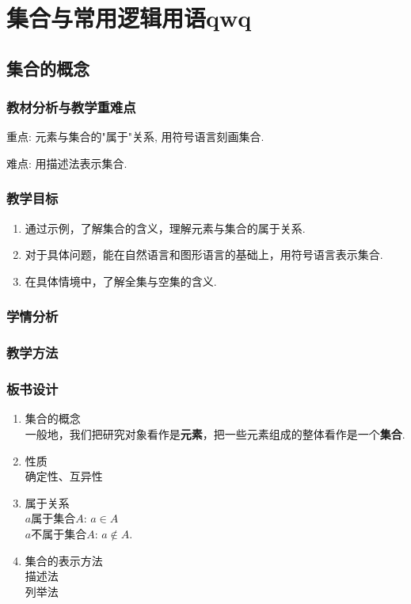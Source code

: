 \chapter{集合与常用逻辑用语qwq}
\section{集合的概念}
\subsection{教材分析与教学重难点}
重点: 元素与集合的"属于"关系, 用符号语言刻画集合.

难点: 用描述法表示集合.
\subsection{教学目标}
\begin{enumerate}
	\item 通过示例，了解集合的含义，理解元素与集合的属于关系.
	\item 对于具体问题，能在自然语言和图形语言的基础上，用符号语言表示集合.
	\item 在具体情境中，了解全集与空集的含义.
\end{enumerate}
\subsection{学情分析}

\subsection{教学方法}

\subsection{板书设计}
\begin{boardenv}[集合的概念]
	\begin{enumerate}
		\item 集合的概念\\
		      一般地，我们把研究对象看作是\textbf{元素}，把一些元素组成的整体看作是一个\textbf{集合}.
		\item 性质\\
			  确定性、互异性
		\item 属于关系\\
		      $a$属于集合$A$: $a\in A$\\
		      $a$不属于集合$A$: $a\notin A$.
		\item 集合的表示方法\\
		      描述法\\
		      列举法
	\end{enumerate}
\end{boardenv}



